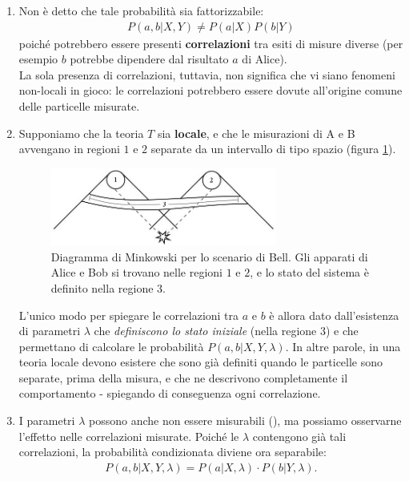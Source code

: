 \documentclass[../../InformazioneQuantistica.tex]{subfiles}
\begin{document}
\begin{enumerate}
\item Non è detto che tale probabilità sia fattorizzabile:
\begin{align*}
P(a,b|X,Y) \neq P(a|X)P(b|Y)
\end{align*}
poiché potrebbero essere presenti \textbf{correlazioni} tra esiti di misure diverse (per esempio $b$ potrebbe dipendere dal risultato $a$ di Alice).\\ %
 La sola presenza di correlazioni, tuttavia, non significa che vi siano fenomeni non-locali in gioco: le correlazioni potrebbero essere dovute all'origine comune delle particelle misurate.
\item Supponiamo che la teoria $T$ sia \textbf{locale}, e che le misurazioni di A e B avvengano in regioni $1$ e $2$ separate da un intervallo di tipo spazio (figura \ref{fig:Bell-diagram}). 
\begin{figure}[H]
\centering
\includegraphics[width=0.7\textwidth]{Immagini/28_3/minkowski2.png}
\caption{Diagramma di Minkowski per lo scenario di Bell. Gli apparati di Alice e Bob si trovano nelle regioni $1$ e $2$, e lo stato del sistema è definito nella regione $3$.\label{fig:Bell-diagram}}
\end{figure}

L'unico modo per spiegare le correlazioni tra $a$ e $b$ è allora dato dall'esistenza di parametri $\lambda$ che \textit{definiscono lo stato iniziale} (nella regione $3$) e che permettano di calcolare le probabilità $P(a,b|X,Y,\lambda)$.
In altre parole, in una teoria locale devono esistere  che sono già definiti quando le particelle sono separate, prima della misura, e che ne descrivono completamente il comportamento - spiegando di conseguenza ogni correlazione. 

\item I parametri $\lambda$ possono anche non essere misurabili (), ma possiamo osservarne l'effetto nelle correlazioni misurate. Poiché le $\lambda$ contengono già tali correlazioni, la probabilità condizionata diviene ora separabile:
\begin{align}\label{eqn:fattorizzabilita}
P(a, b|X,Y,\lambda) = P(a|X,\lambda)\cdot P(b|Y,\lambda).
\end{align}




\end{enumerate}
\end{document}

